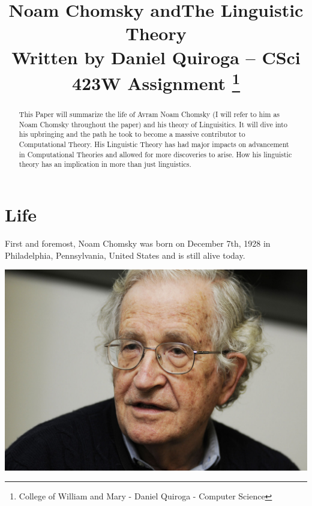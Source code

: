 \documentclass[conference]{IEEEtran}
\begin{document}
\title{ \qquad\qquad Noam Chomsky and\newline The Linguistic Theory\\
{\footnotesize Written by Daniel Quiroga -- CSci 423W Assignment%
}
\thanks{College of William and Mary - Daniel Quiroga - Computer Science}
}



\maketitle

\begin{abstract}
This Paper will summarize the life of Avram Noam Chomsky (I will refer to him as Noam Chomsky throughout the paper) and his theory of Linguisitics. It will dive into his upbringing and the path he took to become a massive contributor to Computational Theory. His Linguistic Theory has had major impacts on advancement in Computational Theories and allowed for more discoveries to arise. How his linguistic theory has an implication in more than just linguistics. 
\end{abstract}

\section{Life}
First and foremost, Noam Chomsky was born on December 7th, 1928 in Philadelphia, Pennsylvania, United States and is still alive today.\newline

\includegraphics[scale=.1]{headshot.jpg} 
\end{document}

